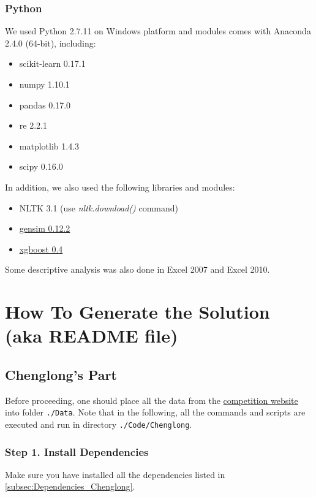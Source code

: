 \documentclass[12pt]{article}
\begin{document}
\begin{appendices}
\subsubsection{Python}
We used Python 2.7.11  on Windows platform and modules comes with Anaconda 2.4.0 (64-bit), including:
\begin{itemize}
\item scikit-learn 0.17.1
\item numpy 1.10.1
\item pandas 0.17.0
\item re 2.2.1
\item matplotlib 1.4.3
\item scipy 0.16.0
\end{itemize}

In addition, we also used the following libraries and modules:
\begin{itemize}
\item NLTK 3.1 (use \emph{nltk.download()} command)
\item \href{https://github.com/piskvorky/gensim/archive/0.12.2.tar.gz}{gensim 0.12.2}
\item \href{https://github.com/dmlc/xgboost/archive/v0.40.tar.gz}{xgboost 0.4}
\end{itemize}

Some descriptive analysis was also done in Excel 2007 and Excel 2010.




\section{How To Generate the Solution (aka README file)}
\subsection{Chenglong's Part}
Before proceeding, one should place all the data from the \href{https://www.kaggle.com/c/home-depot-product-search-relevance/dat}{competition website} into folder \texttt{./Data}. Note that in the following, all the commands and scripts are executed and run in directory \texttt{./Code/Chenglong}.

\subsubsection{Step 1. Install Dependencies}
Make sure you have installed all the dependencies listed in \ref{subsec:Dependencies_Chenglong}.


\end{appendices}
\end{document}
